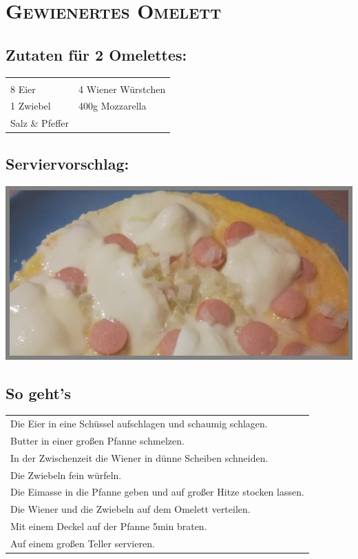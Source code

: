 \section{\textsc{Gewienertes Omelett}}

\subsection*{Zutaten für 2 Omelettes:}

\begin{tabular}{p{7.5cm} p{7.5cm}}
	& \\
	8 Eier & 4 Wiener Würstchen \\
	1 Zwiebel & 400g Mozzarella \\
	Salz \& Pfeffer &
\end{tabular}

\subsection*{Serviervorschlag:}

\includegraphics[width=\textwidth]{img/omlett_gewienert.jpg} \cite{omlettwiener}

\subsection*{So geht's}

\begin{tabular}{p{15cm}}
	Die Eier in eine Schüssel aufschlagen und schaumig schlagen.\\
	Butter in einer großen Pfanne schmelzen.\\
	In der Zwischenzeit die Wiener in dünne Scheiben schneiden.\\
	Die Zwiebeln fein würfeln.\\
	Die Eimasse in die Pfanne geben und auf großer Hitze stocken lassen.\\
	Die Wiener und die Zwiebeln auf dem Omelett verteilen.\\
	Mit einem Deckel auf der Pfanne 5min braten.\\
	Auf einem großen Teller servieren.
\end{tabular}

